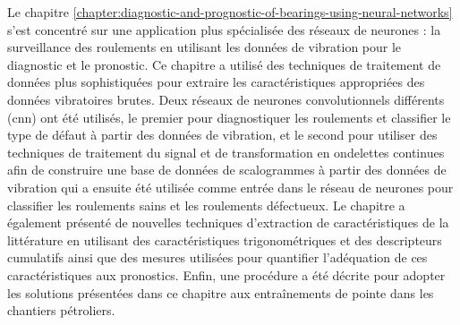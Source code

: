 Le chapitre \ref{chapter:diagnostic-and-prognostic-of-bearings-using-neural-networks} s'est concentré sur une application plus spécialisée des réseaux de neurones : la surveillance des roulements en utilisant les données de vibration pour le diagnostic et le pronostic. Ce chapitre a utilisé des techniques de traitement de données plus sophistiquées pour extraire les caractéristiques appropriées des données vibratoires brutes. Deux réseaux de neurones convolutionnels différents (\acrshort{cnn}) ont été utilisés, le premier pour diagnostiquer les roulements et classifier le type de défaut à partir des données de vibration, et le second pour utiliser des techniques de traitement du signal et de transformation en ondelettes continues afin de construire une base de données de scalogrammes à partir des données de vibration qui a ensuite été utilisée comme entrée dans le réseau de neurones pour classifier les roulements sains et les roulements défectueux. Le chapitre a également présenté de nouvelles techniques d'extraction de caractéristiques de la littérature en utilisant des caractéristiques trigonométriques et des descripteurs cumulatifs ainsi que des mesures utilisées pour quantifier l'adéquation de ces caractéristiques aux pronostics. Enfin, une procédure a été décrite pour adopter les solutions présentées dans ce chapitre aux entraînements de pointe dans les chantiers pétroliers.

